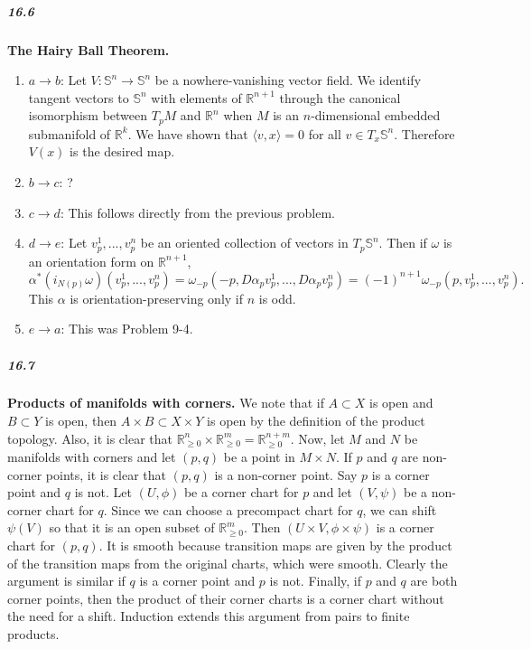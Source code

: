 \documentclass[10pt,letter]{article}
\begin{document}
\subparagraph*{16.6} {\bf The Hairy Ball Theorem.} 
\begin{enumerate}
\item $a \rightarrow b$: Let $V: \mathbb{S}^n \rightarrow \mathbb{S}^n$ be a nowhere-vanishing vector field. We identify tangent vectors to $\mathbb{S}^n$ with elements of $\mathbb{R}^{n+1}$ through the canonical isomorphism between $T_pM$ and $\mathbb{R}^n$ when $M$ is an $n$-dimensional embedded submanifold of $\mathbb{R}^k$. We have shown that $\langle v,x \rangle = 0$ for all $v \in T_x\mathbb{S}^n$. Therefore $V(x)$ is the desired map. 
\item $b \rightarrow c$: ?
\item $c \rightarrow d$: This follows directly from the previous problem.
\item $d \rightarrow e$: Let $v^1_p,...,v^n_p$ be an oriented collection of vectors in $T_p\mathbb{S}^n$. Then if $\omega$ is an orientation form on $\mathbb{R}^{n+1}$, \[ \alpha^{\ast}(i_{N(p)}\omega) (v^1_p,...,v^n_p) = \omega_{-p}(-p,D\alpha_p v^1_p,...,D\alpha_p v^n_p) = (-1)^{n+1} \omega_{-p}(p,v^1_p,...,v^n_p). \] This $\alpha$ is orientation-preserving only if $n$ is odd. 
\item $e \rightarrow a$: This was Problem 9-4. 
\end{enumerate}

\subparagraph*{16.7} {\bf Products of manifolds with corners.} We note that if $A \subset X$ is open and $B \subset Y$ is open, then $A \times B \subset X \times Y$ is open by the definition of the product topology. Also, it is clear that $\mathbb{R}^n_{\geq 0} \times \mathbb{R}^m_{\geq 0} = \mathbb{R}^{n+m}_{\geq 0}$. Now, let $M$ and $N$ be manifolds with corners and let $(p,q)$ be a point in $M \times N$. If $p$ and $q$ are non-corner points, it is clear that $(p,q)$ is a non-corner point. Say $p$ is a corner point and $q$ is not. Let $(U,\phi)$ be a corner chart for $p$ and let $(V,\psi)$ be a non-corner chart for $q$. Since we can choose a precompact chart for $q$, we can shift $\psi(V)$ so that it is an open subset of $\mathbb{R}^m_{\geq 0}$. Then $(U \times V, \phi \times \psi)$ is a corner chart for $(p,q)$. It is smooth because transition maps are given by the product of the transition maps from the original charts, which were smooth.  Clearly the argument is similar if $q$ is a corner point and $p$ is not. Finally, if $p$ and $q$ are both corner points, then the product of their corner charts is a corner chart without the need for a shift. Induction extends this argument from pairs to finite products.
\end{document}
